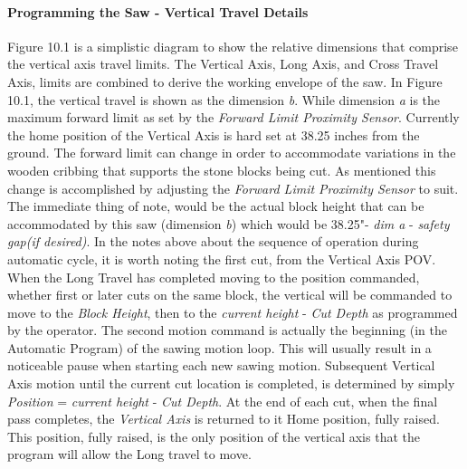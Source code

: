 \paragraph*{Programming the Saw - Vertical Travel Details}Figure 10.1 is a simplistic diagram to show the relative dimensions that comprise the vertical axis travel limits. The Vertical Axis, Long Axis, and Cross Travel Axis, limits are combined to derive the working envelope of the saw. In Figure 10.1, the vertical travel is shown as the dimension \textit{b}. While dimension \textit{a} is the maximum forward limit as set by the \textit{Forward Limit Proximity Sensor}. Currently the home position of the Vertical Axis is hard set at 38.25 inches from the ground. The forward limit can change in order to accommodate variations in the wooden cribbing that supports the stone blocks being cut. As mentioned this change is accomplished by adjusting the \textit{Forward Limit Proximity Sensor} to suit. The immediate thing of note, would be the actual block height that can be accommodated by this saw (dimension \textit{b}) which would be 38.25"- \textit{dim a} - \textit{safety gap(if desired)}. In the notes above about the sequence of operation during automatic cycle, it is worth noting the first cut, from the Vertical Axis POV. When the Long Travel has completed moving to the position commanded, whether first or later cuts on the same block, the vertical will be commanded to move to the \textit{Block Height}, then to the \textit{current height} - \textit{Cut Depth} as programmed by the operator. The second motion command is actually the beginning (in the Automatic Program) of the sawing motion loop. This will usually result in a noticeable pause when starting each new sawing motion. Subsequent Vertical Axis motion until the current cut location is completed, is determined by simply \textit{Position} = \textit{current height} - \textit{Cut Depth}. At the end of each cut, when the final pass completes, the \textit{Vertical Axis} is returned to it Home position, fully raised. This position, fully raised, is the only position of the vertical axis that the program will allow the Long travel to move.
